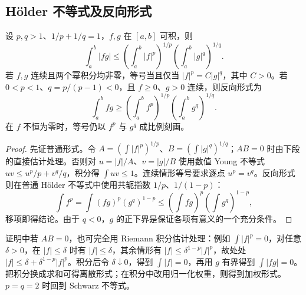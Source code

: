 \subsection{Hölder 不等式及反向形式}
\begin{theorem}
\label{thm:pei-int-holder}
设 $p,q>1$、$1/p+1/q=1$，$f,g$ 在 $[a,b]$ 可积，则
\begin{equation}
 \int_a^b|fg|\le\left(\int_a^b|f|^p\right)^{1/p}
                     \left(\int_a^b|g|^q\right)^{1/q}.
 \label{eq:pei-int-holder}
\end{equation}
若 $f,g$ 连续且两个幂积分均非零，等号当且仅当 $|f|^p=C|g|^q$，其中 $C>0$。若 $0<p<1$、$q=p/(p-1)<0$，且 $f\ge0$、$g>0$ 连续，则反向形式为
\[
 \int_a^bfg\ge\left(\int_a^bf^p\right)^{1/p}\left(\int_a^bg^q\right)^{1/q}.
\]
在 $f$ 不恒为零时，等号仍以 $f^p$ 与 $g^q$ 成比例刻画。
\end{theorem}
\begin{proof}
先证普通形式。令 $A=(\int|f|^p)^{1/p}$、$B=(\int|g|^q)^{1/q}$；$AB=0$ 时由下段的直接估计处理。否则对 $u=|f|/A$、$v=|g|/B$ 使用数值 Young 不等式 $uv\le u^p/p+v^q/q$，积分得 $\int uv\le1$。连续情形等号要求逐点 $u^p=v^q$。反向形式则在普通 Hölder 不等式中使用共轭指数 $1/p$、$1/(1-p)$：
\[
 \int f^p=\int(fg)^p(g^q)^{1-p}
 \le(\int fg)^p(\int g^q)^{1-p},
\]
移项即得结论。由于 $q<0$，$g$ 的正下界是保证各项有意义的一个充分条件。
\end{proof}
证明中若 $AB=0$，也可完全用 Riemann 积分估计处理：例如 $\int|f|^p=0$，对任意 $\delta>0$，在 $|f|\le\delta$ 时有 $|f|\le\delta$，其余情形有 $|f|\le\delta^{1-p}|f|^p$，故处处 $|f|\le\delta+\delta^{1-p}|f|^p$。积分后令 $\delta\downarrow0$，得到 $\int|f|=0$，再用 $g$ 有界得到 $\int|fg|=0$。把积分换成求和可得离散形式；在积分中改用归一化权重，则得到加权形式。$p=q=2$ 时回到 Schwarz 不等式。


